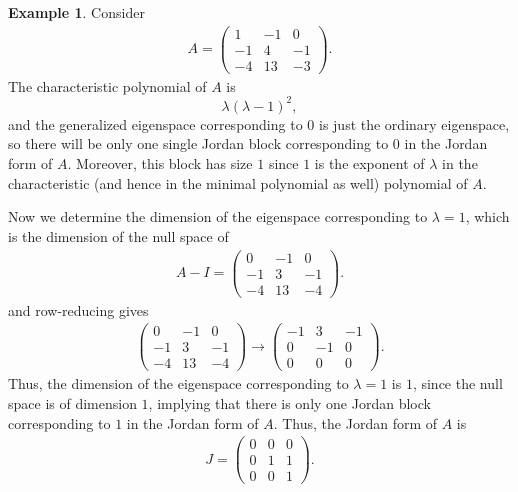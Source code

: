 \documentclass[11pt]{book}
\theoremstyle{definition}
\newtheorem{example}{Example}[chapter]
\numberwithin{equation}{chapter}
\begin{document}
\medskip

\begin{example}
Consider 
\begin{align*}
    A = \begin{pmatrix}
    1 & -1 & 0 \\
    -1 & 4 &  -1 \\
    -4 & 13 & -3 
    \end{pmatrix}.
\end{align*}
The characteristic polynomial of $A$ is 
$$\lambda(\lambda-1)^2,$$
and the generalized eigenspace corresponding to $0$ is just the ordinary eigenspace, so there will be only one single Jordan block corresponding to $0$ in the Jordan form of $A$. Moreover, this block has size $1$ since $1$ is the exponent of $\lambda$ in the characteristic (and hence in the minimal polynomial as well) polynomial of $A$.

Now we determine the dimension of the eigenspace corresponding to $\lambda = 1$, which is the dimension of the null space of
\begin{align*}
    A - I = \begin{pmatrix}
    0 & -1 & 0 \\
    -1 & 3 &  -1 \\
    -4 & 13 & -4 
    \end{pmatrix}.
\end{align*}
and row-reducing gives
\begin{align*}
    \begin{pmatrix}
    0 & -1 & 0 \\
    -1 & 3 &  -1 \\
    -4 & 13 & -4 
    \end{pmatrix} \to \begin{pmatrix}
    -1 & 3 &  -1 \\
    0 & -1 & 0 \\
    0 & 0 & 0 
    \end{pmatrix}.
\end{align*}
Thus, the dimension of the eigenspace corresponding to $\lambda = 1$ is $1$, since the null space is of dimension $1$, implying that there is only one Jordan block corresponding to $1$ in the Jordan form of $A$. Thus, the Jordan form of $A$ is
\begin{align*}
    J = \begin{pmatrix}
    0 & 0 &  0 \\
    0 & 1 & 1 \\
    0 & 0 & 1
    \end{pmatrix}.
\end{align*}
\end{example}
\end{document}
